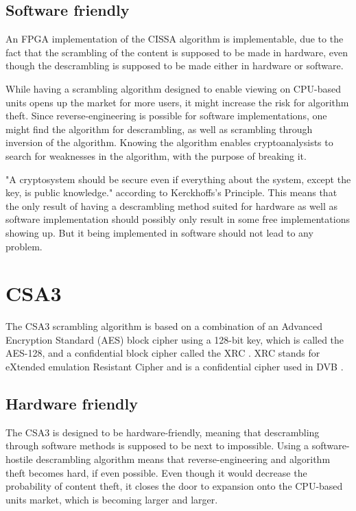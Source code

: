 \subsection{Software friendly}
An FPGA implementation of the CISSA algorithm is implementable, due 
to the fact that the scrambling of the content is supposed to be 
made in hardware, even though the descrambling is supposed to be 
made either in hardware or software.

While having a scrambling algorithm designed to enable viewing on 
CPU-based units opens up the market for more users, it might increase 
the risk for algorithm theft. Since reverse-engineering is possible 
for software implementations, one might find the algorithm for 
descrambling, as well as scrambling through inversion of the algorithm.
Knowing the algorithm enables cryptoanalysists to search for 
weaknesses in the algorithm, with the purpose of breaking it.

"A cryptosystem should be secure even if everything about the system, 
except the key, is public knowledge." according to Kerckhoffs's 
Principle.
This means that the only result of having a descrambling method suited 
for hardware as well as software implementation should possibly only 
result in some free implementations showing up. But it being 
implemented in software should not lead to any problem.


\section{CSA3}
The CSA3 scrambling algorithm is based on a combination of an Advanced 
Encryption Standard (AES) block cipher using a 128-bit key, which is 
called the AES-128, and a confidential block cipher called the XRC 
\citep[p. 8]{DVB:2013}. XRC stands for eXtended emulation Resistant 
Cipher and is a confidential cipher used in DVB \citep[p. 8]{DVB:2013}.

\subsection{Hardware friendly}
The CSA3 is designed to be hardware-friendly, meaning that 
descrambling through software methods is supposed to be next to 
impossible. Using a software-hostile descrambling algorithm means that 
reverse-engineering and algorithm theft becomes hard, if even possible.
Even though it would decrease the probability of content theft, it 
closes the door to expansion onto the CPU-based units market, which is 
becoming larger and larger.

